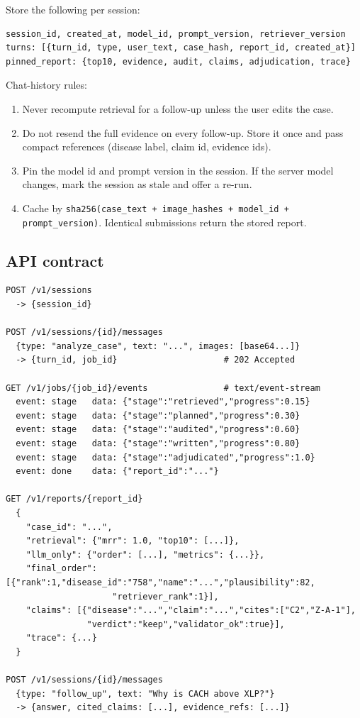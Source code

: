 \documentclass[11pt,a4paper]{article}
\newcommand{\code}[1]{\texttt{\small #1}}
\begin{document}
Store the following per session:
\begin{lstlisting}
session_id, created_at, model_id, prompt_version, retriever_version
turns: [{turn_id, type, user_text, case_hash, report_id, created_at}]
pinned_report: {top10, evidence, audit, claims, adjudication, trace}
\end{lstlisting}

Chat-history rules:
\begin{enumerate}[leftmargin=1.4em]
\item Never recompute retrieval for a follow-up unless the user edits the case.
\item Do not resend the full evidence on every follow-up. Store it once and pass
compact references (disease label, claim id, evidence ids).
\item Pin the model id and prompt version in the session. If the server model
changes, mark the session as stale and offer a re-run.
\item Cache by \code{sha256(case\_text + image\_hashes + model\_id + prompt\_version)}.
Identical submissions return the stored report.
\end{enumerate}

\subsection{API contract}

\begin{lstlisting}
POST /v1/sessions
  -> {session_id}

POST /v1/sessions/{id}/messages
  {type: "analyze_case", text: "...", images: [base64...]}
  -> {turn_id, job_id}                     # 202 Accepted

GET /v1/jobs/{job_id}/events               # text/event-stream
  event: stage   data: {"stage":"retrieved","progress":0.15}
  event: stage   data: {"stage":"planned","progress":0.30}
  event: stage   data: {"stage":"audited","progress":0.60}
  event: stage   data: {"stage":"written","progress":0.80}
  event: stage   data: {"stage":"adjudicated","progress":1.0}
  event: done    data: {"report_id":"..."}

GET /v1/reports/{report_id}
  {
    "case_id": "...",
    "retrieval": {"mrr": 1.0, "top10": [...]},
    "llm_only": {"order": [...], "metrics": {...}},
    "final_order": [{"rank":1,"disease_id":"758","name":"...","plausibility":82,
                     "retriever_rank":1}],
    "claims": [{"disease":"...","claim":"...","cites":["C2","Z-A-1"],
                "verdict":"keep","validator_ok":true}],
    "trace": {...}
  }

POST /v1/sessions/{id}/messages
  {type: "follow_up", text: "Why is CACH above XLP?"}
  -> {answer, cited_claims: [...], evidence_refs: [...]}
\end{lstlisting}
\end{document}
